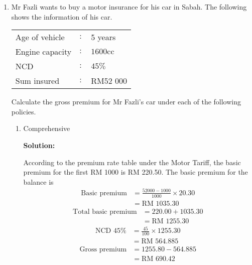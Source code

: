 \documentclass{report}
\newcommand{\sol}{

    \vspace{0.5em}\textbf{Solution:}\vspace{0.5em}}
\begin{document}
\begin{enumerate}
    \item Mr Fazli wants to buy a motor insurance for his car in Sabah. The following
          shows the information of his car.

          \begin{tabular}{|lll|}
              \hline Age of vehicle & $:$ & 5 years            \\
              Engine capacity       & $:$ & $1600 \mathrm{cc}$ \\
              NCD                   & $:$ & $45 \%$            \\
              Sum insured           & $:$ & RM52 000           \\
              \hline
          \end{tabular}

          Calculate the gross premium for Mr Fazli's car under each of the following
          policies.
          \begin{enumerate}
              \item Comprehensive \sol{}

                    According to the premium rate table under the Motor Tariff, the basic premium
                    for the first RM 1000 is RM 220.50. The basic premium for the balance is
                    \begin{align*}
                        \text{Basic premium} & = \frac{52 000 - 1000}{1000} \times 20.30 \\
                                             & = \text{RM } 1 035.30
                    \end{align*}
                    \vspace{-2em}
                    \begin{align*}
                        \text{Total basic premium} & = 220.00 + 1 035.30   \\
                                                   & = \text{RM } 1 255.30
                    \end{align*}
                    \vspace{-2em}
                    \begin{align*}
                        \text{NCD 45\%} & = \frac{45}{100} \times 1 255.30 \\
                                        & = \text{RM } 564.885
                    \end{align*}
                    \vspace{-2em}
                    \begin{align*}
                        \text{Gross premium} & = 1 255.80 - 564.885 \\
                                             & = \text{RM } 690.42
                    \end{align*}


\end{enumerate}
\end{enumerate}
\end{document}
